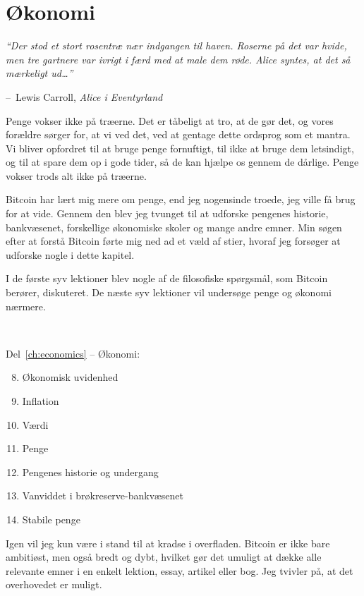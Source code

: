 \documentclass[paper=6in:9in,pagesize=pdftex,
               headinclude=on,footinclude=on,12pt]{scrbook}
\makeatletter
\newenvironment{chapquote}[2][4em]{\setlength{\@tempdima}{#1}%
   \def\chapquote@author{#2}%
   \parshape 1 \@tempdima \dimexpr\textwidth-2\@tempdima\relax%
   \itshape}{\par\normalfont\hfill--\ \chapquote@author\hspace*{\@tempdima}\par\bigskip}
\makeatother
\begin{document}
\chapter*{Økonomi}

\begin{chapquote}{Lewis Carroll, \textit{Alice i Eventyrland}}
\enquote{Der stod et stort rosentræ nær indgangen til haven. Roserne på det var hvide, men tre gartnere var ivrigt i færd med at male dem røde. Alice syntes, at det så mærkeligt ud\ldots}
\end{chapquote}

Penge vokser ikke på træerne. Det er tåbeligt at tro, at de gør det, og vores forældre sørger for, at vi ved det, ved at gentage dette ordsprog som et mantra. Vi bliver opfordret til at bruge penge fornuftigt, til ikke at bruge dem letsindigt, og til at spare dem op i gode tider, så de kan hjælpe os gennem de dårlige. Penge vokser trods alt ikke på træerne.

Bitcoin har lært mig mere om penge, end jeg nogensinde troede, jeg ville få brug for at vide. Gennem den blev jeg tvunget til at udforske pengenes historie, bankvæsenet, forskellige økonomiske skoler og mange andre emner. Min søgen efter at forstå Bitcoin førte mig ned ad et væld af stier, hvoraf jeg forsøger at udforske nogle i dette kapitel.

I de første syv lektioner blev nogle af de filosofiske spørgsmål, som Bitcoin berører, diskuteret. De næste syv lektioner vil undersøge penge og økonomi nærmere.

~\begin{samepage} Del~\ref{ch:economics} -- Økonomi:\begin{enumerate}
  \setcounter{enumi}{7}
  \item Økonomisk uvidenhed \item Inflation \item Værdi \item Penge \item Pengenes historie og undergang \item Vanviddet i brøkreserve-bankvæsenet \item Stabile penge \end{enumerate}
\end{samepage}

Igen vil jeg kun være i stand til at kradse i overfladen. Bitcoin er ikke bare ambitiøst, men også bredt og dybt, hvilket gør det umuligt at dække alle relevante emner i en enkelt lektion, essay, artikel eller bog. Jeg tvivler på, at det overhovedet er muligt.
\end{document}

